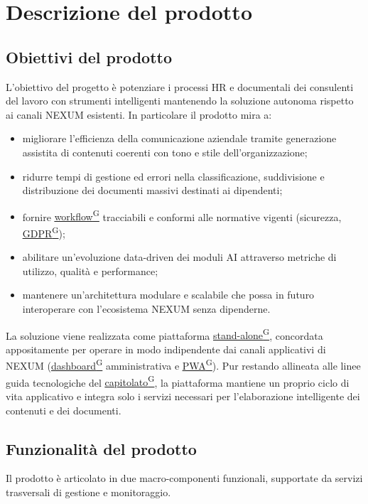 ﻿\documentclass[a4paper,12pt]{article}
\providecommand{\glslink}[2]{\href{https://alittlebyte-19.github.io/Documentazione/glossario.html\#gls-#1}{\underline{#2}\textsuperscript{\scriptsize G}}}
\begin{document}
\section{Descrizione del prodotto}

\subsection{Obiettivi del prodotto}

L'obiettivo del progetto è potenziare i processi HR e documentali dei consulenti del lavoro con strumenti intelligenti mantenendo la soluzione autonoma rispetto ai canali NEXUM esistenti. In particolare il prodotto mira a:
\begin{itemize}
    \item migliorare l'efficienza della comunicazione aziendale tramite generazione assistita di contenuti coerenti con tono e stile dell'organizzazione;
    \item ridurre tempi di gestione ed errori nella classificazione, suddivisione e distribuzione dei documenti massivi destinati ai dipendenti;
    \item fornire \glslink{workflow}{workflow} tracciabili e conformi alle normative vigenti (sicurezza, \glslink{gdpr}{GDPR});
    \item abilitare un'evoluzione data-driven dei moduli AI attraverso metriche di utilizzo, qualità e performance;
    \item mantenere un'architettura modulare e scalabile che possa in futuro interoperare con l'ecosistema NEXUM senza dipenderne.
\end{itemize}
La soluzione viene realizzata come piattaforma \glslink{standalone}{stand-alone}, concordata appositamente per operare in modo indipendente dai canali applicativi di NEXUM (\glslink{dashboard}{dashboard} amministrativa e \glslink{pwa-progressive-web-app}{PWA}). Pur restando allineata alle linee guida tecnologiche del \glslink{capitolato}{capitolato}, la piattaforma mantiene un proprio ciclo di vita applicativo e integra solo i servizi necessari per l'elaborazione intelligente dei contenuti e dei documenti.


\subsection{Funzionalità del prodotto}

Il prodotto è articolato in due macro-componenti funzionali, supportate da servizi trasversali di gestione e monitoraggio.
\end{document}
